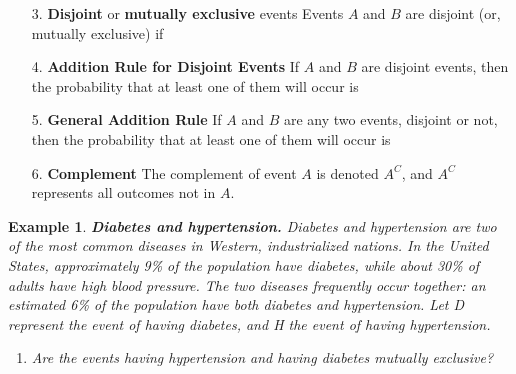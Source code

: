 \documentclass[12pt]{amsart}
\newtheorem{example}[theorem]{Example}
\begin{document}
{\begin{enumerate}
\item[3.] \textbf{Disjoint} or \textbf{mutually exclusive} events\newline
Events $A$ and $B$ are disjoint (or, mutually exclusive) if
\vspace{3cm}

\item[4.] \textbf{Addition Rule for Disjoint Events}\newline
If $A$ and $B$ are disjoint events,  then the probability that at least one of them will occur is 
\vspace{3cm}


\item[5.] \textbf{General Addition Rule}\newline
If $A$ and $B$ are any two events, disjoint or not, then the probability that at least one of them will occur is
\vspace{3cm}


\item[6.] \textbf{Complement}\newline
The complement of event $A$ is denoted $A^C$, and $A^C$ represents all outcomes not in $A$.
\vspace{1cm}


\end{enumerate}

\newpage
\begin{example}  \textbf{Diabetes and hypertension.} \newline
 Diabetes and hypertension are two of the most common diseases in Western, industrialized nations. In the United States, approximately 9\% of the population have diabetes, while about 30\% of adults have high blood pressure. The two diseases frequently occur together: an estimated 6\% of the population have both diabetes and hypertension. \newline
Let D represent the event of having diabetes, and H the event of having hypertension. 

\begin{enumerate}

\item Are the events having hypertension and having diabetes mutually exclusive?


\end{enumerate}
\end{example}}
\end{document}
